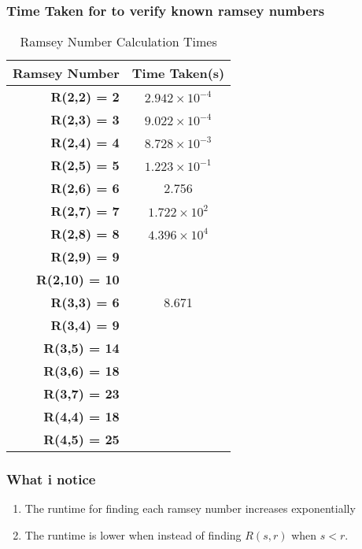\documentclass{Assignment}
\begin{document}
\subsubsection*{Time Taken for to verify known ramsey numbers}
\begin{table}[hbt!]
	\centering
	\begin{adjustbox}{max width=\textwidth}
		\begin{tabular}{| r | c |}
	\toprule
	\multicolumn{1}{|c|}{Ramsey Number} & Time Taken(s) \\
	\midrule
	\textbf{R(2,2) = 2} & $2.942 \times 10^{-4}$ \\
	\hline
	\textbf{R(2,3) = 3} & $9.022 \times 10^{-4}$ \\
	\hline
	\textbf{R(2,4) = 4} & $8.728 \times 10^{-3}$ \\
	\hline
	\textbf{R(2,5) = 5} & $1.223 \times 10^{-1}$ \\
	\hline
	\textbf{R(2,6) = 6} & 2.756 \\
	\hline
	\textbf{R(2,7) = 7} & $1.722 \times 10^{2}$ \\
	\hline
	\textbf{R(2,8) = 8} & $4.396 \times 10^{4}$ \\
	\hline
	\textbf{R(2,9) = 9} & \\
	\hline
	\textbf{R(2,10) = 10} & \\
	\hline
	\textbf{R(3,3) = 6} & 8.671 \\
	\hline
	\textbf{R(3,4) = 9} & \\
	\hline
	\textbf{R(3,5) = 14} & \\
	\hline
	\textbf{R(3,6) = 18} & \\
	\hline
	\textbf{R(3,7) = 23} & \\
	\hline
	\textbf{R(4,4) = 18} & \\
	\hline
	\textbf{R(4,5) = 25} & \\
	\bottomrule
\end{tabular}
	\end{adjustbox}
	\caption{Ramsey Number Calculation Times}
	\label{tab:ramsey_times}
\end{table}
\newpage
\subsubsection*{What i notice}
\begin{enumerate}
\item The runtime for finding each ramsey number increases exponentially
\item The runtime is lower when instead of finding $R(s,r)$ when $s<r$. 
\end{enumerate}
\end{document}
